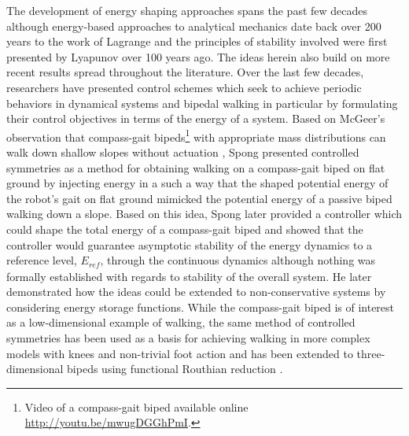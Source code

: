 \documentclass[english]{article}
\begin{document}
The development of energy shaping approaches spans the past few decades
although energy-based approaches to analytical mechanics date back over 200
years to the work of Lagrange
and the principles of stability involved were first presented by Lyapunov
over 100 years ago.
% 
The ideas herein also build on more recent results spread throughout the literature.
%
Over the last few decades, researchers have presented control schemes which seek
to achieve periodic behaviors in dynamical systems and bipedal walking in
particular by formulating their control objectives in terms of the energy of a
system.
%
Based on McGeer's observation that compass-gait
bipeds\footnote{%
  Video of a compass-gait biped available online
  \href{http://youtu.be/mwugDGGhPmI}{http://youtu.be/mwugDGGhPmI}.%
} with appropriate mass distributions can walk down shallow slopes without
actuation \cite{McGeer1990}, Spong presented controlled symmetries
\cite{Spong2007} as a method for obtaining walking on a compass-gait biped on
flat ground by injecting energy in a such a way that the shaped potential energy
of the robot's gait on flat ground mimicked the potential energy of a passive
biped walking down a slope.
%
% 
Based on this idea, Spong later provided a controller which could shape the
total energy of a compass-gait biped and showed that the controller would
guarantee asymptotic stability of the energy dynamics to a reference level,
$E_{\mathit{ref}}$, through the continuous dynamics although nothing was
formally established with regards to stability of the overall system.
%
He later demonstrated how the ideas could be extended to non-conservative
systems \cite{Spong2007} by considering energy storage functions.
%
While the compass-gait biped is of interest as a low-dimensional example of
walking, the same method of controlled symmetries has been used as a basis for
achieving walking in more complex models with knees and non-trivial foot action
\cite{Sinnet2009} and has been extended to three-dimensional bipeds using
functional Routhian reduction \cite{Sinnet2009a}.
\end{document}
